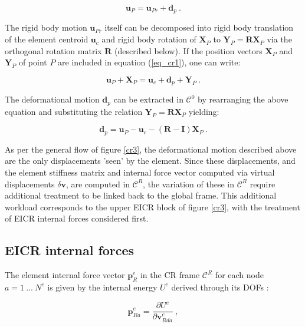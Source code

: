 \begin{equation} 
\mathbf{u}_P = 
\mathbf{u}_{Pr} + \mathbf{d}_p
\label{eq_cr1}\ .
\end{equation}

The rigid body motion $\mathbf{u}_{Pr}$ itself can be decomposed into rigid body translation of the element centroid $\mathbf{u}_c$ and rigid body rotation of $\mathbf{X}_P$ to $\mathbf{Y}_P = \mathbf{R} \mathbf{X}_P$ via the orthogonal rotation matrix $\mathbf{R}$ (described below). If the position vectors $\mathbf{X}_P$ and $\mathbf{Y}_P$ of point $P$ are included in equation (\ref{eq_cr1}), one can write:

\begin{equation} 
\mathbf{u}_P + \mathbf{X}_P = 
\mathbf{u}_{c} + \mathbf{d}_p + \mathbf{Y}_P
\label{eq_cr2}\ .
\end{equation}

The deformational motion $\mathbf{d}_p$ can be extracted in $\mathscr{C}^0$ by rearranging the above equation and substituting the relation $\mathbf{Y}_P = \mathbf{R} \mathbf{X}_P$ yielding:

\begin{equation} 
\mathbf{d}_p = 
\mathbf{u}_P - \mathbf{u}_{c} - (\mathbf{R} - \mathbf{I}) \mathbf{X}_P 
\label{eq_cr3}\ .
\end{equation}

As per the general flow of figure \ref{cr3}, the deformational motion described above are the only displacements 'seen' by the element. Since these displacements, and the element stiffness matrix and internal force vector computed via virtual displacements $\delta \mathbf{v}$, are computed in $\mathscr{C}^R$, the variation of these in $\mathscr{C}^R$ require additional treatment to be linked back to the global frame. This additional workload corresponds to the upper EICR block of figure \ref{cr3}, with the treatment of EICR internal forces considered first.

\subsection{EICR internal forces}
The element internal force vector $\mathbf{p}_R^e$ in the CR frame $\mathscr{C}^R$ for each node $a = 1\ ...\ N^e$ is given by the internal energy $U^e$ derived through its DOFs \cite{felippa2000systematic}:

\begin{equation} 
\mathbf{p}_{Ra}^e = 
\frac{\partial U^e}{\partial \mathbf{v}_{Rda}^e}
\label{eq_cr4}\ ,
\end{equation}

